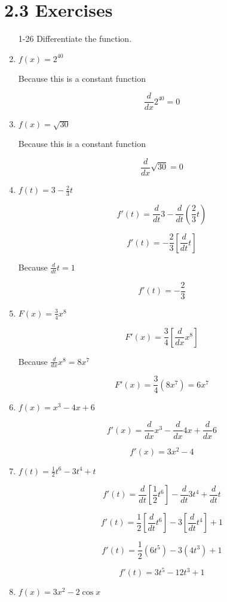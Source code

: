 \documentclass{article}
\begin{document}
	\section{2.3 Exercises}

	\begin{enumerate}
		\item[1-26] Differentiate the function.

		\item $f(x) = 2^{40}$

			Because this is a constant function

			$$\frac{d}{dx} 2^{40} = 0$$

		\item $f(x) = \sqrt{30}$

			Because this is a constant function

			$$\frac{d}{dx} \sqrt{30} = 0$$

		\item $f(t) = 3 - \frac{2}{3}t$

			$$f'(t) = \frac{d}{dt}3 - \frac{d}{dt} (\frac{2}{3}t)$$

			$$f'(t) = -\frac{2}{3} [\frac{d}{dt} t]$$

			Because $\frac{d}{dt} t = 1$

			$$f'(t) = -\frac{2}{3}$$

		\item $F(x) = \frac{3}{4}x^8$

			$$F'(x) = \frac{3}{4} [\frac{d}{dx} x^8]$$

			Because $\frac{d}{dx} x^8 = 8x^7$

			$$F'(x) = \frac{3}{4} (8x^7) = 6x^7$$

		\item $f(x) = x^3 - 4x + 6$

			$$f'(x) = \frac{d}{dx} x^3 - \frac{d}{dx} 4x + \frac{d}{dx} 6$$

			$$f'(x) = 3x^2 - 4$$	

		\item $f(t) = \frac{1}{2}t^6 - 3t^4 + t$

			$$f'(t) = \frac{d}{dt} [\frac{1}{2}t^6] - \frac{d}{dt} 3t^4 + \frac{d}{dt} t$$

			$$f'(t) = \frac{1}{2} [\frac{d}{dt} t^6] - 3[\frac{d}{dt} t^4] + 1$$

			$$f'(t) = \frac{1}{2} (6t^5) - 3(4t^3) + 1$$

			$$f'(t) = 3t^5 - 12t^3 + 1$$

		\item $f(x) = 3x^2 - 2\cos x$


\end{enumerate}
\end{document}
